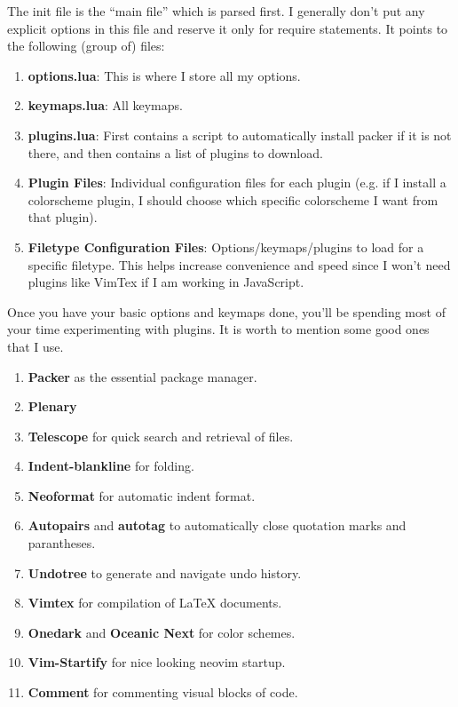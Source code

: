 \documentclass{article}
\theoremstyle{definition}
\begin{document}
      The init file is the ``main file'' which is parsed first. I generally don't put any explicit options in this file and reserve it only for require statements. It points to the following (group of) files: 
      \begin{enumerate}
        \item \textbf{options.lua}: This is where I store all my options. 
        \item \textbf{keymaps.lua}: All keymaps. 
        \item \textbf{plugins.lua}: First contains a script to automatically install packer if it is not there, and then contains a list of plugins to download. 
        \item \textbf{Plugin Files}: Individual configuration files for each plugin (e.g. if I install a colorscheme plugin, I should choose which specific colorscheme I want from that plugin). 
        \item \textbf{Filetype Configuration Files}: Options/keymaps/plugins to load for a specific filetype. This helps increase convenience and speed since I won't need plugins like VimTex if I am working in JavaScript. 
      \end{enumerate}

      Once you have your basic options and keymaps done, you'll be spending most of your time experimenting with plugins. It is worth to mention some good ones that I use. 
      \begin{enumerate}
        \item \textbf{Packer} as the essential package manager.  
        \item \textbf{Plenary} 
        \item \textbf{Telescope} for quick search and retrieval of files.  
        \item \textbf{Indent-blankline} for folding. 
        \item \textbf{Neoformat} for automatic indent format. 
        \item \textbf{Autopairs} and \textbf{autotag} to automatically close quotation marks and parantheses. 
        \item \textbf{Undotree} to generate and navigate undo history. 
        \item \textbf{Vimtex} for compilation of LaTeX documents. 
        \item \textbf{Onedark} and \textbf{Oceanic Next} for color schemes. 
        \item \textbf{Vim-Startify} for nice looking neovim startup. 
        \item \textbf{Comment} for commenting visual blocks of code. 
      \end{enumerate}
\end{document}
